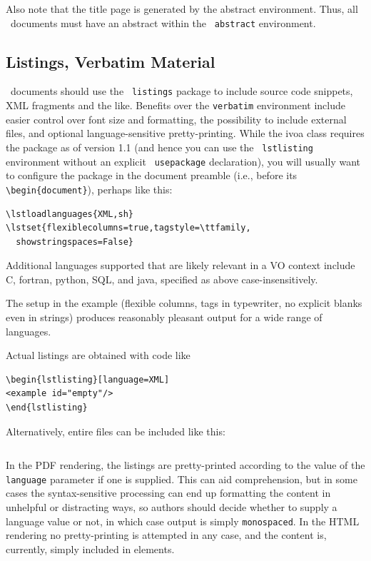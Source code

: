 \documentclass[11pt,a4paper]{ivoa}
\newcommand{\texword}[1]{\texttt{\color{texcolor} #1}}
\begin{document}
Also note that the title page is generated by the abstract environment.
Thus, all \ivoatex\ documents must have an abstract within the
\texword{abstract} environment.

\subsection{Listings, Verbatim Material}
\label{sect:verbatim}

\ivoatex\ documents should use the \texword{listings} package to include
source code snippets, XML fragments and the like.
Benefits over the \verb|verbatim| environment include easier control over
font size and formatting, the possibility to include external files,
and optional language-sensitive pretty-printing.
While the ivoa class
requires the package as of version 1.1 (and hence you can use the
\texword{lstlisting} environment without an explicit
\texword{usepackage} declaration), you will usually want to configure
the package in the document preamble (i.e., before its
\verb|\begin{document}|), perhaps like this:

\begin{lstlisting}
\lstloadlanguages{XML,sh}
\lstset{flexiblecolumns=true,tagstyle=\ttfamily,
  showstringspaces=False}
\end{lstlisting}

Additional
languages supported that are likely relevant in a VO context include C,
fortran, python, SQL, and java, specified as above case-insensitively.

The setup in the example (flexible columns, tags in
typewriter, no explicit blanks even in strings)
produces reasonably pleasant output for a wide range of languages.

Actual listings are obtained with code like
\begin{verbatim}
\begin{lstlisting}[language=XML]
<example id="empty"/>
\end{lstlisting}
\end{verbatim}
Alternatively, entire files can be included like this:
\begin{verbatim}

\end{verbatim}
In the PDF rendering, the listings are pretty-printed
according to the value of the \verb|language| parameter if one is supplied.
This can aid comprehension, but in some cases the syntax-sensitive
processing can end up formatting the content in
unhelpful or distracting ways,
so authors should decide whether to supply a language value
or not, in which case output is simply \verb|monospaced|.
In the HTML rendering no pretty-printing is attempted in any case,
and the content is, currently, simply included in  elements.
\end{document}
